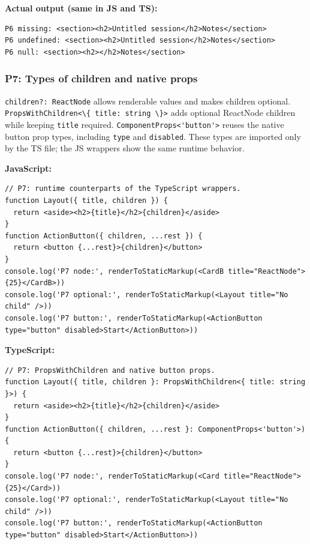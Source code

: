 \documentclass[
  11pt,
]{article}
\newcommand{\passthrough}[1]{#1}
\begin{document}
\textbf{Actual output (same in JS and TS):}

\begin{lstlisting}
P6 missing: <section><h2>Untitled session</h2>Notes</section>
P6 undefined: <section><h2>Untitled session</h2>Notes</section>
P6 null: <section><h2></h2>Notes</section>
\end{lstlisting}

\subsubsection{P7: Types of children and native
props}\label{p7-types-of-children-and-native-props}

\passthrough{\lstinline!children?: ReactNode!} allows renderable values
and makes children optional.
\passthrough{\lstinline!PropsWithChildren<\{ title: string \}>!} adds
optional ReactNode children while keeping
\passthrough{\lstinline!title!} required.
\passthrough{\lstinline!ComponentProps<'button'>!} reuses the native
button prop types, including \passthrough{\lstinline!type!} and
\passthrough{\lstinline!disabled!}. These types are imported only by the
TS file; the JS wrappers show the same runtime behavior.

\textbf{JavaScript:}

\begin{lstlisting}
// P7: runtime counterparts of the TypeScript wrappers.
function Layout({ title, children }) {
  return <aside><h2>{title}</h2>{children}</aside>
}
function ActionButton({ children, ...rest }) {
  return <button {...rest}>{children}</button>
}
console.log('P7 node:', renderToStaticMarkup(<CardB title="ReactNode">{25}</CardB>))
console.log('P7 optional:', renderToStaticMarkup(<Layout title="No child" />))
console.log('P7 button:', renderToStaticMarkup(<ActionButton type="button" disabled>Start</ActionButton>))
\end{lstlisting}

\textbf{TypeScript:}

\begin{lstlisting}
// P7: PropsWithChildren and native button props.
function Layout({ title, children }: PropsWithChildren<{ title: string }>) {
  return <aside><h2>{title}</h2>{children}</aside>
}
function ActionButton({ children, ...rest }: ComponentProps<'button'>) {
  return <button {...rest}>{children}</button>
}
console.log('P7 node:', renderToStaticMarkup(<Card title="ReactNode">{25}</Card>))
console.log('P7 optional:', renderToStaticMarkup(<Layout title="No child" />))
console.log('P7 button:', renderToStaticMarkup(<ActionButton type="button" disabled>Start</ActionButton>))
\end{lstlisting}
\end{document}

